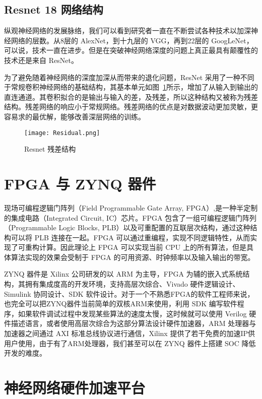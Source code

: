 \subsection{Resnet 18 网络结构}

纵观神经网络的发展脉络，我们可以看到研究者一直在不断尝试各种技术以加深神经网络的层数。从8层的 AlexNet，到十九层的 VGG，再到22层的 GoogLeNet，可以说，技术一直在进步。但是在突破神经网络深度的问题上真正最具有颠覆性的技术还是来自 ResNet\citep{DBLP:journals/corr/HeZRS15}。

为了避免随着神经网络的深度加深从而带来的退化问题，ResNet 采用了一种不同于常规卷积神经网络的基础结构，其基本单元如图~\ref{fig:Residual}所示，增加了从输入到输出的直连通道。其卷积拟合的是输出与输入的差，及残差，所以这种结构又被称为残差结构。残差网络的响应小于常规网络。残差网络的优点是对数据波动更加灵敏，更容易求的最优解，能够改善深层网络的训练。

\begin{figure}[!htbp]
    \centering
    \texttt{[image: Residual.png]}
    \caption{Resnet 残差结构}
    \label{fig:Residual}
\end{figure}


\section{FPGA 与 ZYNQ 器件}

现场可编程逻辑门阵列（Field Programmable Gate Array, FPGA）,是一种半定制的集成电路（Integrated Circuit, IC）芯片。FPGA 包含了一组可编程逻辑门阵列（Programmable Logic Blocks, PLB）以及可重配置的互联层次结构，通过这种结构可以将 PLB 连接在一起。FPGA 可以通过重编程，实现不同逻辑特性，从而实现了可重构计算。因此理论上 FPGA 可以实现当前 CPU 上的所有算法，但是具体算法实现的效果会受制于 FPGA 的可用资源、时钟频率以及输入输出的带宽。

ZYNQ 器件是 Xilinx 公司研发的以 ARM 为主导，FPGA 为辅的嵌入式系统结构，其拥有集成度高的开发环境，支持高层次综合、Vivado 硬件逻辑设计、Simulink 协同设计、SDK 软件设计。对于一个不熟悉FPGA的软件工程师来说，也完全可以把ZYNQ器件当前简单的双核ARM来使用，利用 SDK 编写软件程序，如果软件调试过程中发现某些算法的速度太慢，这时候就可以使用 Verilog 硬件描述语言，或者使用高层次综合为这部分算法设计硬件加速器，ARM 处理器与加速器之间通过 AXI 标准总线协议进行通信，Xilinx 提供了若干免费的加速IP供用户使用，由于有了ARM处理器，我们甚至可以在 ZYNQ 器件上搭建 SOC 降低开发的难度。

\section{神经网络硬件加速平台}

